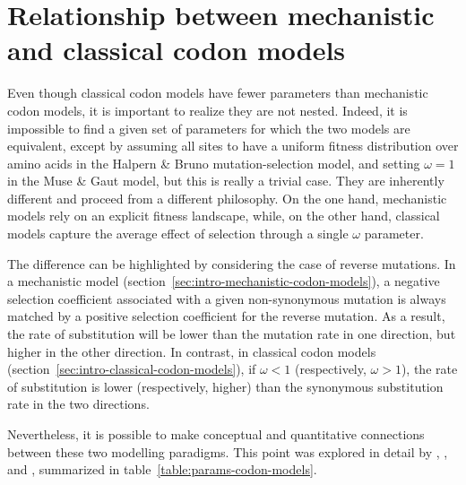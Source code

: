 \section{Relationship between mechanistic and classical codon models}
\label{sec:relationship-between-mechanistic-and-classical-codon-models}

Even though classical \gls{codon} models have fewer parameters than mechanistic \gls{codon} models, it is important to realize they are not nested.
Indeed, it is impossible to find a given set of parameters for which the two models are equivalent, except by assuming all sites to have a uniform fitness distribution over amino acids in the Halpern \& Bruno mutation-selection model, and setting $\omega = 1$ in the Muse \& Gaut model, but this is really a trivial case.
They are inherently different and proceed from a different philosophy.
On the one hand, mechanistic models rely on an explicit fitness landscape, while, on the other hand, classical models capture the average effect of selection through a single $\omega$ parameter.

The difference can be highlighted by considering the case of reverse mutations.
In a mechanistic model (section~\ref{sec:intro-mechanistic-codon-models}), a negative selection coefficient associated with a given \gls{non-synonymous} mutation is always matched by a positive selection coefficient for the reverse mutation.
As a result, the rate of \gls{substitution} will be lower than the mutation rate in one direction, but higher in the other direction.
In contrast, in classical \gls{codon} models (section~\ref{sec:intro-classical-codon-models}), if $\omega < 1$ (respectively, $\omega> 1$), the rate of \gls{substitution} is lower (respectively, higher) than the \gls{synonymous} \gls{substitution} rate in the two directions.

Nevertheless, it is possible to make conceptual and quantitative connections between these two modelling paradigms.
This point was explored in detail by \citet{Spielman2015}, \citet{DosReis2015}, \citet{Jones2016} and \citet{Rodrigue2016}, summarized in table~\ref{table:params-codon-models}.


